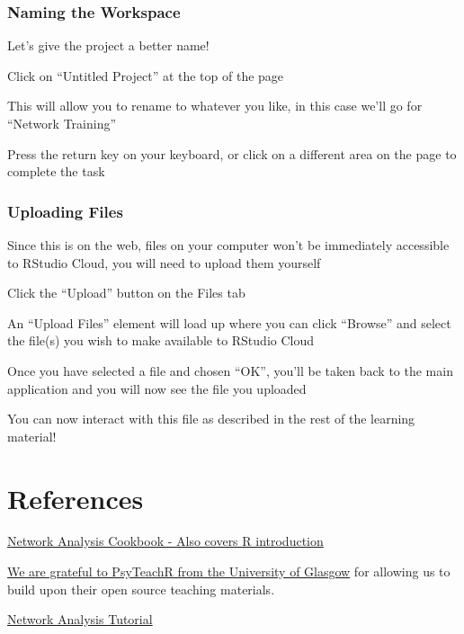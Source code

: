 \documentclass[]{book}
\begin{document}
\hypertarget{naming-the-workspace}{%
\subsection{Naming the Workspace}\label{naming-the-workspace}}

Let's give the project a better name!

Click on ``Untitled Project'' at the top of the page

This will allow you to rename to whatever you like, in this case we'll go for ``Network Training''

Press the return key on your keyboard, or click on a different area on the page to complete the task

\hypertarget{uploading-files}{%
\subsection{Uploading Files}\label{uploading-files}}

Since this is on the web, files on your computer won't be immediately accessible to RStudio Cloud, you will need to upload them yourself

Click the ``Upload'' button on the Files tab

An ``Upload Files'' element will load up where you can click ``Browse'' and select the file(s) you wish to make available to RStudio Cloud

Once you have selected a file and chosen ``OK'', you'll be taken back to the main application and you will now see the file you uploaded

You can now interact with this file as described in the rest of the learning material!

\hypertarget{references}{%
\chapter{References}\label{references}}

\href{http://sachaepskamp.com/files/Cookbook.html}{Network Analysis Cookbook - Also covers R introduction}

\href{https://psyteachr.github.io/}{We are grateful to PsyTeachR from the University of Glasgow} for allowing us to build upon their open source teaching materials.

\href{https://www.tandfonline.com/doi/full/10.1080/21642850.2018.1521283}{Network Analysis Tutorial}


\end{document}
